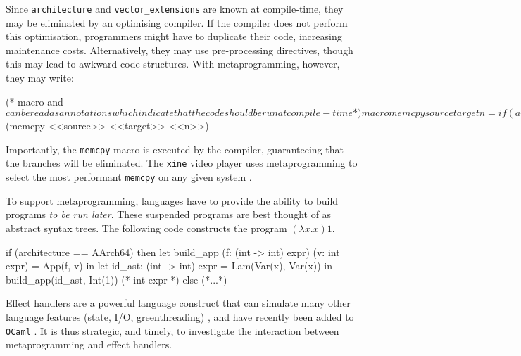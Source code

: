 Since \texttt{architecture} and \texttt{vector_extensions} are known at compile-time, they may be eliminated by an optimising compiler. If the compiler does not perform this optimisation, programmers might have to duplicate their code, increasing maintenance costs. Alternatively, they may use pre-processing directives, though this may lead to awkward code structures. With metaprogramming, however, they may write: 
\begin{macocaml}
(* macro and $ can be read as annotations which 
   indicate that the code should be run at compile-time *)
macro memcpy source target n = if (architecture == AArch64) then 
                               (* generate this program, to be run later *)
                             else 
                                match vector_extensions with
                                | None -> (* generate this program *)
                                | Some(AVX512) -> (* generate this program *)
                                | ...
$(memcpy <<source>> <<target>> <<n>>)
\end{macocaml}
Importantly, the \texttt{memcpy} macro is executed by the compiler, guaranteeing that the branches will be eliminated. The \texttt{xine} video player uses metaprogramming to select the most performant \texttt{memcpy} on any given system \citep{huceke-memcpy}.

To support metaprogramming, languages have to provide the ability to build programs \textit{to be run later}. These suspended programs are best thought of as abstract syntax trees. The following code constructs the program $(\lambda x. x) 1$.
\begin{ocaml}
if (architecture == AArch64) then 
  let build_app (f: (int -> int) expr) (v: int expr) = App(f, v) in
  let id_ast: (int -> int) expr = Lam(Var(x), Var(x)) in
  build_app(id_ast, Int(1)) (* int expr *)
else 
  (*...*)
\end{ocaml}

Effect handlers are a powerful language construct that can simulate many other language features (state, I/O, greenthreading) \citep{pretnar-15}, and have recently been added to \texttt{OCaml} \citep{sivaramakrishnan-21}.  It is thus strategic, and timely, to investigate the interaction between metaprogramming and effect handlers. 

